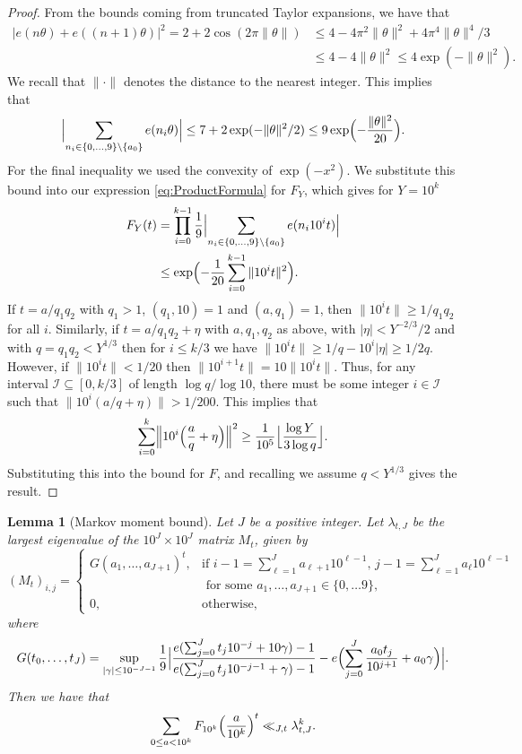 \documentclass[10pt]{amsart}
\theoremstyle{plain}
\newtheorem{lmm}[thrm]{Lemma}
\numberwithin{sblmm}{thrm}
\numberwithin{equation}{section}
\begin{document}
\begin{proof}
%
From the bounds coming from truncated Taylor expansions, we have that
%
\begin{align*}
|e(n\theta)+e((n+1)\theta)|^2=2+2\cos(2\pi \|\theta\|)&\le 4-4\pi^2 \|\theta\|^2+4\pi^4 \|\theta\|^4/3\\
&\le 4-4\|\theta\|^2\le 4\exp(-\|\theta\|^2).
\end{align*}
%
We recall that $\|\cdot\|$ denotes the distance to the nearest integer. This implies that
\[
\Bigl|\sum_{n_i\in\{0,\dots,9\}\backslash \{a_0\}}e(n_i \theta)\Bigr|\le 7+2\exp(-\|\theta\|^2/2)\le 9\exp\Bigl(-\frac{\|\theta\|^2}{20}\Bigr).
\]
For the final inequality we used the convexity of $\exp(-x^2)$. We substitute this bound into our expression \eqref{eq:ProductFormula} for $F_Y$, which gives for $Y=10^k$
%
\begin{align*}
F_{Y}(t)&=\prod_{i=0}^{k-1}\frac{1}{9}\Bigl|\sum_{n_i\in\{0,\dots,9\}\backslash \{a_0\}}e(n_i 10^it)\Bigr|\\
&\le \exp\Bigl(-\frac{1}{20}\sum_{i=0}^{k-1}\|10^i t\|^2\Bigr).
\end{align*}
%
If $t=a/q_1q_2$ with $q_1>1$, $(q_1,10)=1$ and $(a,q_1)=1$, then $\|10^i t\|\ge 1/q_1q_2$ for all $i$. Similarly, if $t=a/q_1q_2+\eta$ with $a,q_1,q_2$ as above, with $|\eta|<Y^{-2/3}/2$ and with $q=q_1q_2<Y^{1/3}$ then for $i\le k/3$ we have $\|10^i t\|\ge 1/q-10^i|\eta|\ge 1/2q$. However, if $\|10^i t\|<1/20$ then $\|10^{i+1}t\|=10\|10^i t\|$. Thus, for any interval $\mathcal{I}\subseteq[0,k/3]$ of length $\log{q}/\log{10}$, there must be some integer $i\in\mathcal{I}$ such that $\|10^i (a/q+\eta)\|>1/200$. This implies that
\[
\sum_{i=0}^k\Bigl\|10^i\Bigl(\frac{a}{q}+\eta\Bigr)\Bigr\|^2\ge \frac{1}{10^5}\Bigl\lfloor\frac{\log{Y}}{3\log{q}}\Bigr\rfloor.
\]
Substituting this into the bound for $F$, and recalling we assume $q<Y^{1/3}$ gives the result.
%
\end{proof}
%
%
%
%
\begin{lmm}[Markov moment bound]\label{lmm:Markov}
%
Let $J$ be a positive integer. Let $\lambda_{t,J}$ be the largest eigenvalue of the $10^J\times10^J$ matrix $M_{t}$, given by
\[
(M_{t})_{i,j}=
\begin{cases}
G(a_1,\dots,a_{J+1})^t, &\text{if }i-1=\sum_{\ell=1}^J a_{\ell+1}10^{\ell-1},\, j-1=\sum_{\ell=1}^J a_\ell 10^{\ell-1}\\
&\text{ for some }a_1,\dots,a_{J+1}\in\{0,\dots 9\},\\
0, &\text{otherwise,}
\end{cases}
\]
where
\[
 G(t_0,\dots,t_{J})=\sup_{|\gamma|\le 10^{-J-1} }\frac{1}{9}\Bigl|\frac{e(\sum_{j=0}^{J}t_{j}10^{-j}+10\gamma)-1}{e(\sum_{j=0}^{J}t_{j}10^{-j-1}+\gamma)-1}-e\Bigl(\sum_{j=0}^{J}\frac{a_0 t_{j}}{10^{j+1}}+a_0\gamma\Bigr)\Bigr|.
\]
Then we have that
\[
\sum_{0\le a<10^k}F_{10^k}\Bigl(\frac{a}{10^k}\Bigr)^t\ll_{J,t} \lambda_{t,J}^k.
\]
%
\end{lmm}
\end{document}
